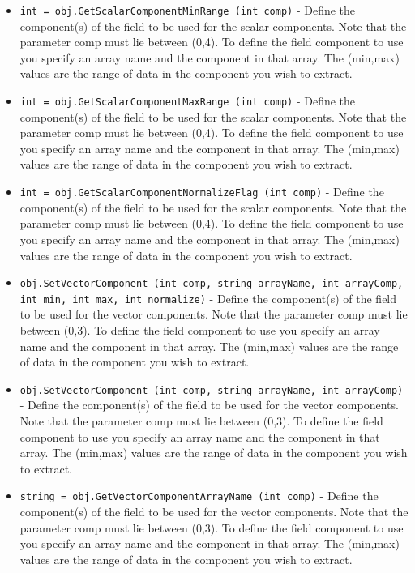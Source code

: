 \begin{itemize}
\item  \verb|int = obj.GetScalarComponentMinRange (int comp)| -  Define the component(s) of the field to be used for the scalar
 components.  Note that the parameter comp must lie between (0,4). To
 define the field component to use you specify an array name and the
 component in that array. The (min,max) values are the range of data in
 the component you wish to extract.

\item  \verb|int = obj.GetScalarComponentMaxRange (int comp)| -  Define the component(s) of the field to be used for the scalar
 components.  Note that the parameter comp must lie between (0,4). To
 define the field component to use you specify an array name and the
 component in that array. The (min,max) values are the range of data in
 the component you wish to extract.

\item  \verb|int = obj.GetScalarComponentNormalizeFlag (int comp)| -  Define the component(s) of the field to be used for the scalar
 components.  Note that the parameter comp must lie between (0,4). To
 define the field component to use you specify an array name and the
 component in that array. The (min,max) values are the range of data in
 the component you wish to extract.

\item  \verb|obj.SetVectorComponent (int comp, string arrayName, int arrayComp, int min, int max, int normalize)| -  Define the component(s) of the field to be used for the vector
 components.  Note that the parameter comp must lie between (0,3). To
 define the field component to use you specify an array name and the
 component in that array. The (min,max) values are the range of data in
 the component you wish to extract.

\item  \verb|obj.SetVectorComponent (int comp, string arrayName, int arrayComp)| -  Define the component(s) of the field to be used for the vector
 components.  Note that the parameter comp must lie between (0,3). To
 define the field component to use you specify an array name and the
 component in that array. The (min,max) values are the range of data in
 the component you wish to extract.

\item  \verb|string = obj.GetVectorComponentArrayName (int comp)| -  Define the component(s) of the field to be used for the vector
 components.  Note that the parameter comp must lie between (0,3). To
 define the field component to use you specify an array name and the
 component in that array. The (min,max) values are the range of data in
 the component you wish to extract.


\end{itemize}
